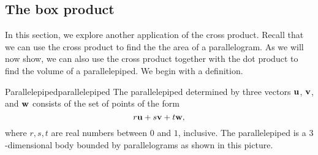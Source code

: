 \subsection{The box product}

In this section, we explore another application of the cross product.
Recall that we can use the cross product to find the the area of a
parallelogram. As we will now show, we can also use the cross product
together with the dot product to find the volume of a
parallelepiped. We begin with a definition.

\begin{definition}{Parallelepiped}{parallelepiped}
  The parallelepiped%
   determined by three vectors $\vect{u}$,
  $\vect{v}$, and $\vect{w}$ consists of the set of points of the form
  \begin{equation*}
    r\/\vect{u}+s\/\vect{v}+t\/\vect{w},
  \end{equation*}
  where $r,s,t$ are real numbers between $0$ and $1$, inclusive. The
  parallelepiped is a $3$-dimensional body bounded by parallelograms
  as shown in this picture.
  \begin{center}
  \end{center}
\end{definition}

